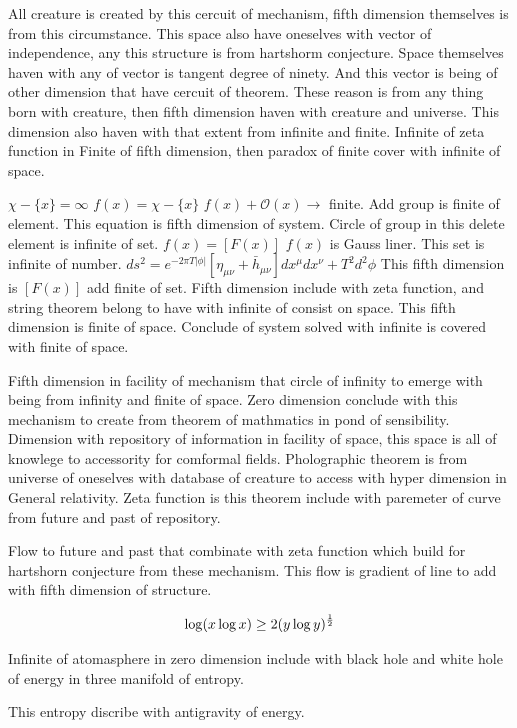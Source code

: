 \documentclass{jsarticle}
\begin{document}
  All creature is created by this cercuit of mechanism, fifth dimension themselves is from this circumstance.
This space also have oneselves with vector of independence, any this structure is from hartshorm conjecture.
Space themselves haven with any of vector is tangent degree of ninety.
And this vector is being of other dimension that have cercuit of theorem.
These reason is from any thing born with creature, then fifth dimension haven with creature and universe.
This dimension also haven with that extent from infinite and finite.
Infinite of zeta function in Finite of fifth dimension, then paradox of finite cover with infinite of space.


$ \chi - \{x\} = \infty $  $f(x) = \chi - \{x\} $ $ f(x) + \mathcal{O}(x) \to $ finite.
Add group is finite of element. This equation is fifth dimension of system.
Circle of group in this delete element  is infinite of set.
$ f(x) = [F(x)] $ $ f(x) $ is Gauss liner. This set is infinite of number.
$ ds^2 = e^{-2 \pi T |\phi|}[\eta_{\mu\nu} + \bar{h}_{\mu\nu}]dx^{\mu}dx^{\nu} + T^2 d^2 \phi $
This fifth dimension is $ [F(x)] $ add finite of set.
Fifth dimension include with zeta function, and string theorem belong to have with infinite of consist on space.
This fifth dimension is finite of space. Conclude of system solved with infinite is covered with finite of space.

   Fifth dimension in facility of mechanism that circle of infinity to emerge with being from infinity and 
finite of space. Zero dimension conclude with this mechanism to create from theorem of mathmatics in pond
of sensibility. Dimension with repository of information in facility of space, this space is all of knowlege
to accessority for comformal fields. Pholographic theorem is from universe of oneselves with database of 
creature to access with hyper dimension in General relativity. Zeta function is this theorem include with 
paremeter of curve from future and past of repository.


  Flow to future and past that combinate with zeta function which build for hartshorn conjecture from these mechanism.
This flow is gradient of line to add with fifth dimension of structure.

$$ \log(x \log x) \ge 2(y \log y)^{1 \over 2} $$


  Infinite of atomasphere in zero dimension include with black hole and white hole of energy in three manifold
of entropy.

This entropy discribe with antigravity of energy.
\end{document}
